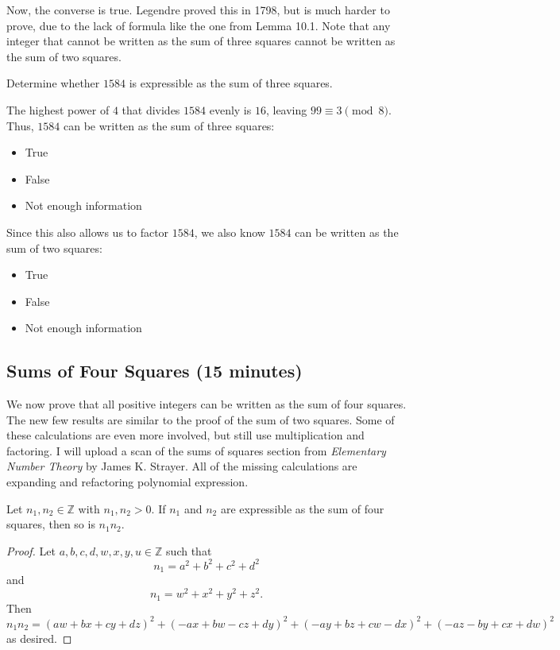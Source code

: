 \documentclass[letterpaper, 11 pt]{article}
\begin{document}
Now, the converse is true. Legendre proved this in 1798, but is much harder to prove, due to the lack of formula like the one from Lemma 10.1. Note that any integer that cannot be written as the sum of three squares cannot be written as the sum of two squares.

\begin{example}
 Determine whether $1584$ is expressible as the sum of three squares. 
 
 The highest power of $4$ that divides $1584$ evenly is $ {16}$, leaving $ {99}\equiv {3} \pmod 8.$ Thus, $1584$ can be written as the sum of three squares:
\begin{poll}
\begin{itemize}
 \item {True}
 \item{False}
 \item{Not enough information}
 \end{itemize}
\end{poll}

Since this also allows us to factor $1584$, we  also know $1584$ can be written as the sum of two squares:
\begin{poll}
\begin{itemize}
 \item{True}
 \item{False}
 \item{Not enough information}
\end{itemize}
\end{poll}
\end{example}
\subsection{Sums of Four Squares (15 minutes)}
We now prove that all positive integers can be written as the sum of four squares. The new few results are similar to the proof of the sum of two squares. Some of these calculations are even more involved, but still use multiplication and factoring. I will upload a scan of the sums of squares section from \emph{Elementary Number Theory} by James K. Strayer. All of the missing calculations are expanding and refactoring polynomial expression. 

\begin{thm}
 Let $n_1,n_2\in\mathbb{Z}$ with $n_1,n_2>0$. If $n_1$ and $n_2$ are expressible as the sum of four squares, then so is $n_1n_2$. 
\end{thm}
\begin{proof}
 Let $a,b,c,d,w,x,y,u\in\mathbb{Z}$ such that \[n_1=a^2+b^2+c^2+d^2\] and \[n_1=w^2+x^2+y^2+z^2.\]  Then \[n_1n_2=(aw+bx+cy+dz)^2+(-ax+bw-cz+dy)^2+(-ay+bz+cw-dx)^2+(-az-by+cx+dw)^2 \] as desired.
\end{proof}
\end{document}
